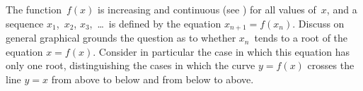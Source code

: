 The function~$f(x)$ is increasing and continuous (see ) for all
values of~$x$, and a sequence $x_{1}$,~$x_{2}$, $x_{3}$,~\dots\ is defined by the equation
$x_{n+1} = f(x_{n})$. Discuss on general graphical grounds the question as to
whether $x_{n}$~tends to a root of the equation $x = f(x)$. Consider in particular
the case in which this equation has only one root, distinguishing the cases in
which the curve $y = f(x)$ crosses the line $y = x$ from above to below and from
below to above.


